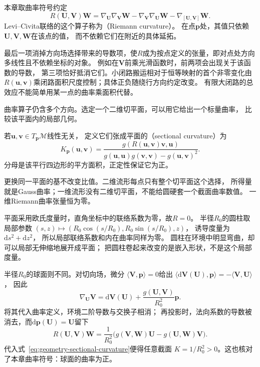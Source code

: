 \begin{definition}[Riemann曲率]
\label{def:geometry-riemann-curvature}
本章取曲率符号约定
\begin{equation}
 R(\bm U,\bm V)\bm W
 =\nabla_{\bm U}\nabla_{\bm V}\bm W
  -\nabla_{\bm V}\nabla_{\bm U}\bm W
  -\nabla_{[\bm U,\bm V]}\bm W.
 \label{eq:geometry-riemann-curvature}
\end{equation}
Levi--Civita联络的这个算子称为（Riemann curvature）。
在点$\bm p$处，其值只依赖$\bm U,\bm V,\bm W$在该点的值，
而不依赖它们在附近的具体延拓。
\end{definition}
最后一项消掉方向场选择带来的导数项，使$R$成为按点定义的张量，即对点处方向多线性且不依赖坐标的对象。
例如在$\bm V$前乘光滑函数时，前两项会出现关于该函数的导数，
第三项恰好抵消它们。小闭路搬运相对于恒等映射的首个非零变化由
$R(\bm u,\bm v)$乘闭路面积尺度控制；具体正负随绕行方向约定改变。
有限大闭路的总效应不能简单用某一点的曲率乘面积代替。

曲率算子仍含多个方向。选定一个二维切平面，可以用它给出一个标量曲率，
比较该平面内的局部几何。
\begin{definition}[截面曲率]
\label{def:geometry-sectional-curvature}
若$\bm u,\bm v\in T_{\bm p}\mathcal M$线性无关，
定义它们张成平面的（sectional curvature）为
\begin{equation}
 K_{\bm p}(\bm u,\bm v)
 =\frac{g(R(\bm u,\bm v)\bm v,\bm u)}
 {g(\bm u,\bm u)g(\bm v,\bm v)-g(\bm u,\bm v)^2}.
 \label{eq:geometry-sectional-curvature}
\end{equation}
分母是该平行四边形的平方面积，正定性保证它为正。
\end{definition}
更换同一平面的基不改变比值。二维流形每点只有整个切平面这个选择，
所得量就是Gauss曲率；一维流形没有二维切平面，不能给圆硬套一个截面曲率数值。
一维Riemann曲率张量恒为零。

平面采用欧氏度量时，直角坐标中的联络系数为零，故$R=0$。
半径$R_0$的圆柱取局部参数
$(s,z)\mapsto(R_0\cos(s/R_0),R_0\sin(s/R_0),z)$，
诱导度量为$\mathrm ds^2+\mathrm dz^2$，
所以局部联络系数和内在曲率同样为零。
圆柱在环境中明显弯曲，却可以局部无伸缩地展开成平面；
把圆柱卷起来改变的是嵌入形状，不是这个局部度量。

半径$R_0$的球面则不同。对切向场，微分
$\langle\bm V,\bm p\rangle=0$给出
$\langle\mathrm d\bm V(\bm U),\bm p\rangle=-\langle\bm V,\bm U\rangle$，
因此
\[
 \nabla_{\bm U}\bm V
 =\mathrm d\bm V(\bm U)+\frac{g(\bm U,\bm V)}{R_0^2}\bm p.
\]
将其代入曲率定义，环境二阶导数与交换子相消；
再投影时，法向系数的导数被消去，而$\mathrm d\bm p(\bm U)=\bm U$留下
\[
 R(\bm U,\bm V)\bm W
 =\frac1{R_0^2}\bigl(g(\bm V,\bm W)\bm U-g(\bm U,\bm W)\bm V\bigr).
\]
代入式~\eqref{eq:geometry-sectional-curvature}便得任意截面
$K=1/R_0^2>0$。这也核对了本章曲率符号：球面的曲率为正。

